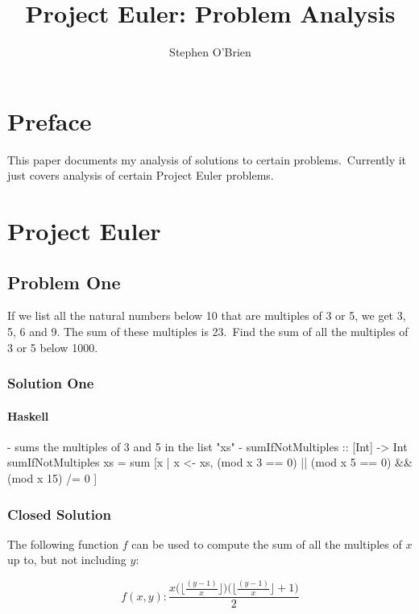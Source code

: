 \documentclass[11pt,a4paper]{report}
\title{Project Euler: Problem Analysis}
\author{Stephen O'Brien}
\begin{document}
	\maketitle
	\tableofcontents
	
	\chapter*{Preface}
		This paper documents my analysis of solutions to certain problems.\
		Currently it just covers analysis of certain Project Euler problems.


	
	\chapter{Project Euler}			
	    \section{Problem One}
	        If we list all the natural numbers below 10 that are multiples of 3 or 5, we get 3, 5, 6 and 9. The sum of these multiples is 23.\
            Find the sum of all the multiples of 3 or 5 below 1000.
	            
		        \subsection{Solution One}
		            \subsubsection{Haskell}
	                	\begin{haskellCode}
	{-
	    sums the multiples of 3 and 5 in the list "xs" 
	-}
	sumIfNotMultiples :: [Int] -> Int
	sumIfNotMultiples xs = sum [x | x <- xs, (mod x 3 == 0) 
	                           || (mod x 5 == 0) && (mod x 15) /= 0 ]
		
	        			\end{haskellCode}

		        \subsection{Closed Solution}
		            The following function $f$ can be used to compute the sum of all the multiples of $x$ up to, but not including $y$:
		            
                    \[ f(x,y) : \frac{x \Big(\Big\lfloor \frac{(y - 1)}{x} \Big\rfloor \Big) \Big(\Big\lfloor \frac{(y - 1)}{x} \Big\rfloor + 1 \Big)}{2}\]
                    
\end{document}

